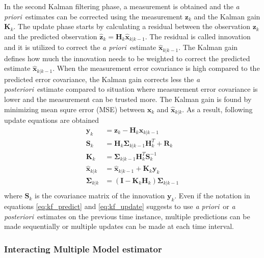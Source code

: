 \documentclass[english, 12pt, a4paper, elec, utf8, a-1b, online]{aaltothesis}
\renewcommand{\vec}[1]{\mathbf{#1}}
\newcommand{\inv}[1]{#1^{-1}}
\newcommand{\xprior}{\hat{\vec{x}}_{k|k-1}}
\newcommand{\xpost}{\hat{\vec{x}}_{k|k}}
\newcommand{\priorecov}{\boldsymbol{\Sigma}_{k|k-1}}
\newcommand{\postecov}{\boldsymbol{\Sigma}_{k|k}}
\newcommand{\prefitinnov}{\vec{y}_k}
\newcommand{\x}{\vec{x}_k}
\newcommand{\z}{\vec{z}_k}
\newcommand{\omodel}{\vec{H}_k}
\newcommand{\ocov}{\vec{R}_k}
\newcommand{\innocov}{\vec{S}_k}
\newcommand{\eye}{\vec{I}}
\newcommand{\gain}{\vec{K}_k}
\def\prior{\textit{a priori}\ }
\def\post{\textit{a posteriori}\ }
\newcommand{\zhat}{\hat{\vec{z}}_k}
\begin{document}
In the second Kalman filtering phase, a measurement is obtained and the \prior estimates can be corrected using the measurement $\z$ and the Kalman gain $\gain$.
The update phase starts by calculating a residual between the observation $\z$ and the predicted observation $\zhat = \omodel \xprior$.
The residual is called innovation and it is utilized to correct the \prior estimate $\xprior$.
The Kalman gain defines how much the innovation needs to be weighted to correct the predicted estimate $\xprior$.
When the measurement error covariance is high compared to the predicted error covariance, the Kalman gain corrects less the \post estimate compared to situation where measurement error covariance is lower and the measurement can be trusted more. 
The Kalman gain is found by minimizing mean squre error (MSE) between $\x$ and $\xpost$.
As a result, following update equations are obtained
\begin{subequations}
\label{eq:kf_update}
\begin{align}
    \prefitinnov &= \z - \omodel \xprior \label{eq:kf_prefit_innov}\\ 
    \innocov &= \omodel \priorecov \omodel^T + \ocov \label{eq:kf_innov_cov}\\ 
    \gain &= \priorecov \omodel^T \inv{\innocov} \label{eq:kf_gain}\\ 
    \xpost &= \xprior + \gain \prefitinnov \label{eq:kf_update_x}\\ 
    \postecov &= \left( \eye - \gain \omodel \right) \priorecov  \label{eq:kf_post_error_cov}\\
\end{align}
\end{subequations}
where $\innocov$ is the covariance matrix of the innovation $\prefitinnov$. 
Even if the notation in equations \eqref{eq:kf_predict} and \eqref{eq:kf_update} suggests to use \prior or \post estimates on the previous time instance, multiple predictions can be made sequentially or multiple updates can be made at each time interval.

\subsubsection{Interacting Multiple Model estimator}
\label{sec:IMM}
\end{document}
